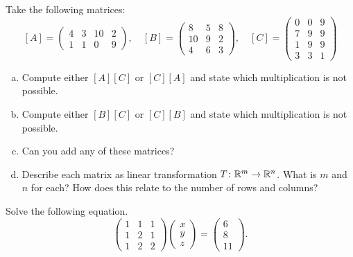 \documentclass[12pt]{article} %
\begin{document}
\begin{problem}
%
\end{problem}

\begin{problem}
    Take the following matrices:
    \[
        [A] = \begin{pmatrix} 4 & 3 & 10 & 2 \\ 1 & 1 & 0 & 9 \end{pmatrix},\quad [B] = \begin{pmatrix} 8 & 5 & 8 \\ 10 & 9 & 2 \\ 4 & 6 &3 \end{pmatrix}, \quad [C] = \begin{pmatrix} 0 & 0 & 9 \\ 7 & 9 & 9 \\ 1 & 9 & 9 \\ 3 & 3 & 1\end{pmatrix}
    \]
    \begin{enumerate}[(a)]
        \item Compute either $[A][C]$ or $[C][A]$ and state which multiplication is not possible.
        \item Compute either $[B][C]$ or $[C][B]$ and state which multiplication is not possible.
        \item Can you add any of these matrices?
        \item Describe each matrix as linear transformation $T\colon \mathbb{R}^m \to \mathbb{R}^n$. What is $m$ and $n$ for each? How does this relate to the number of rows and columns?
    \end{enumerate}
\end{problem}


\begin{problem}
Solve the following equation.
\[
\begin{pmatrix} 1 & 1 & 1 \\ 1 & 2 & 1 \\ 1 & 2 & 2 \end{pmatrix} \begin{pmatrix} x \\ y \\ z \end{pmatrix} = \begin{pmatrix} 6 \\ 8 \\ 11 \end{pmatrix}.
\]
\end{problem}
\end{document}
